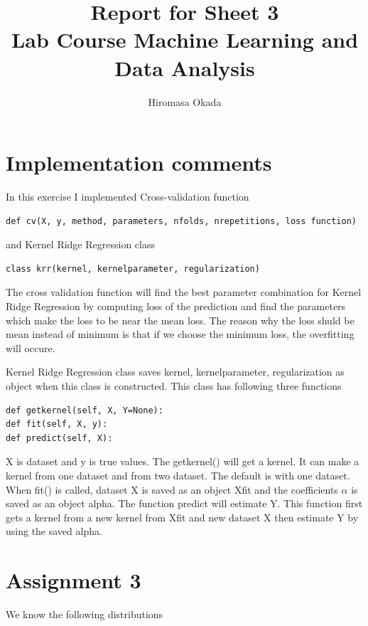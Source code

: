 \documentclass[a4paper,11pt]{article}
\begin{document}
\author{Hiromasa Okada}
\title{\vspace{-2cm}Report for Sheet 3\\
\small{Lab Course Machine Learning and Data Analysis}}
\maketitle

\section*{Implementation comments}
In this exercise I implemented Cross-validation function 

\begin{verbatim}
def cv(X, y, method, parameters, nfolds, nrepetitions, loss function)
\end{verbatim}
and Kernel Ridge Regression class 

\begin{verbatim}
class krr(kernel, kernelparameter, regularization)
\end{verbatim}

The cross validation function will find the best parameter combination for Kernel Ridge Regression by computing loss of the prediction and find the parameters which make the loss to be near the mean loss. The reason why the loss shuld be mean instead of minimum is that if we choose the minimum loss, the overfitting will occure.

Kernel Ridge Regression class saves kernel, kernelparameter, regularization as object when this class is constructed. This class has following three functions 

\begin{verbatim}
def getkernel(self, X, Y=None):
def fit(self, X, y):
def predict(self, X):
\end{verbatim}
 
X is dataset and y is true values. The getkernel() will get a kernel. It can make a kernel from one dataset and from two dataset. The default is with one dataset. When fit() is called, dataset X is saved as an object Xfit and the coefficients $\alpha$ is saved as an object alpha. The function predict will estimate Y. This function first gets a kernel from a new kernel from Xfit and new dataset X then estimate Y by using the saved alpha.




\section*{Assignment 3}
We know the following distributions
\end{document}
